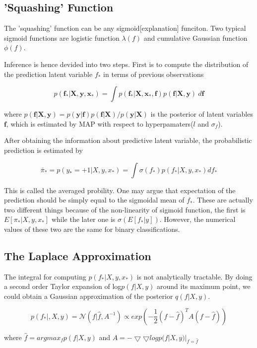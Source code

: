 \documentclass[11pt]{report}
\begin{document}
\subsection{'Squashing' Function}
The 'squashing' function can be any sigmoid[explanation] funciton. Two typical sigmoid functions are logistic function $\lambda (f)$ and cumulative Gaussian function $\phi (f)$.

Inference is hence devided into two steps. First is to compute  the distribution of the prediction latent variable $f_*$ in terms of previous observations 

\[p(\boldsymbol f_*|\boldsymbol X,\boldsymbol y,\boldsymbol x_*) = \int p(\boldsymbol f_*|\boldsymbol X,\boldsymbol x_*,\boldsymbol f)p(\boldsymbol f|\boldsymbol X,\boldsymbol y)\ d\boldsymbol f\]

where \(p(\boldsymbol f|\boldsymbol X,\boldsymbol y) = {p(\boldsymbol y|\boldsymbol f)p(\boldsymbol f|\boldsymbol X)}/{p(\boldsymbol y|\boldsymbol X)}\) is the posterior of latent variables $\boldsymbol f$, which is estimated by MAP with respect to hyperpamaters($l$ and $\sigma_f$).

After obtaining the information about predictive latent variable, the probabilistic prediction is estimated by

\[\bar{\pi}_* = p(y_* = +1|X,y,x_*) = \int \sigma (f_*)p(f_*|X,y,x_*) df_*\] 

This is called the averaged probility. One may argue that expectation of the prediction should be simply equal to the sigmoidal mean of $f_*$. These are actually two different things because of the non-linearity of sigmoid function, the first is $E[\pi_*|X,y,x_*]$ while the later one is $\sigma (E[f_*|y])$. However, the numerical values of these two are the same for binary classifications. 

\subsection{The Laplace Approximation}

The integral for computing $p(f_*| X, y, x_*)$ is not analytically tractable. By doing a second order Taylor expansion of log$p(f|X,y)$ around its maximum point, we could obtain a Gaussian approximation of the posterior $q(f|X,y)$.

\[p(f_*|,X,y) = \mathcal{N}(f|\hat{f},A^{-1}) \propto exp(-\frac{1}{2}(f-\hat{f})^T A(f-\hat{f}))\]

where $\hat{f} = argmax_f p(f|X,y)$ and $A = -\bigtriangledown\bigtriangledown logp(f|X,y)|_{f=\hat{f}}$
\end{document}

